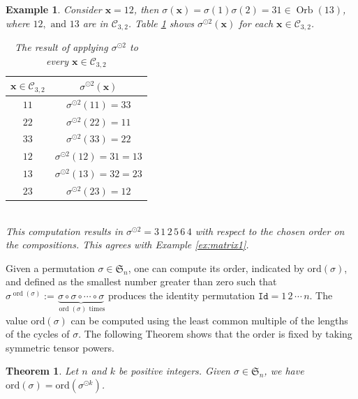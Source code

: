 \documentclass[12pt]{amsart}
\newtheorem{theorem}{Theorem}[section]
\newtheorem{example}{Example}{}
\newcommand{\Orb}{\operatorname{Orb}}
\begin{document}
\begin{example}
\label{ex:actDiag}
    Consider $\textbf{x} = 12$, then $\sigma (\textbf{x}) = \sigma(1)\sigma(2) = 31\in \Orb(13)$, where $12, \text{ and }13$ are in $\mathcal{C}_{3,2}$. Table \ref{tab:actionsigma} shows $\sigma ^{\odot 2}(\textbf{x})$ for each $\textbf{x}\in \mathcal{C}_{3,2}$.
    \begin{table}[!ht]
        \centering
        \begin{tabular}{|c|c|}
        \hline
                $\textbf{x}\in \mathcal{C}_{3,2}$&$\sigma ^{\odot 2}(\textbf{x})$\\
                \hline 
             $11$& $\sigma ^{\odot 2}(11)=33$  \\
             $22$& $\sigma ^{\odot 2}(22)=11$\\
             $33$& $\sigma ^{\odot 2}(33)=22$\\
             $12$& $\sigma ^{\odot 2}(12)=31=13$\\
             $13$& $\sigma ^{\odot 2}(13)=32=23$\\
             $23$& $\sigma ^{\odot 2}(23)=12$\\
             \hline
        \end{tabular}
        \caption{The result of applying $\sigma ^{\odot 2}$ to every $\textbf{x}\in \mathcal{C}_{3,2}$}
        \label{tab:actionsigma}
    \end{table}\\
This computation results in $\sigma ^{\odot 2} = 3\,1\,2\,5\,6\,4$ with respect to the chosen order on the compositions. This agrees with Example \ref{ex:matrix1}.
\end{example}
Given a permutation $\sigma \in \mathfrak{S}_n$, one can compute its order, indicated by $\mathrm{ord}(\sigma)$, and defined as the smallest number greater than zero such that $\sigma ^{\operatorname{ord}(\sigma)}:=\underbrace{\sigma \circ \sigma \circ \cdots \circ \sigma}_{\operatorname{ord}(\sigma) \text{ times} }$ produces the identity permutation $\mathtt{Id} = 1\, 2\, \cdots \, n$. The value $\mathrm{ord}(\sigma)$ can be computed using the least common multiple of the lengths of the cycles of $\sigma$. The following Theorem shows that the order is fixed by taking symmetric tensor powers.
\begin{theorem}
\label{theo:order}
    Let $n$ and $k$ be positive integers. Given $\sigma \in \mathfrak{S}_n$, we have $\mathrm{ord}(\sigma) = \mathrm{ord}(\sigma^{\odot k})$.
\end{theorem}
\end{document}
